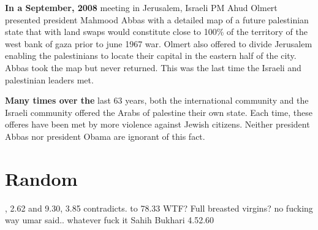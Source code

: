 \textbf{In a September, 2008} meeting in Jerusalem, Israeli PM Ahud Olmert presented president Mahmood Abbas with
a detailed map of a future palestinian state that with land swaps would constitute close to 100\% of the territory
of the west bank of gaza prior to june 1967 war. Olmert also offered to divide Jerusalem enabling the palestinians
to locate their capital in the eastern half of the city. Abbas took the map but never returned. This was the last
time the Israeli and palestinian leaders met.

\textbf{Many times over the} last 63 years, both the international community and the Israeli community offered
the Arabs of palestine their own state. Each time, these offeres have been met by more violence against Jewish
citizens. Neither president Abbas nor president Obama are ignorant of this fact. 


\section{Random}
, 2.62 and 9.30, 3.85 contradicts.
 to 78.33 WTF? Full breasted virgins?
 no fucking way
 umar said.. whatever fuck it
\noindent Sahih Bukhari 4.52.60


